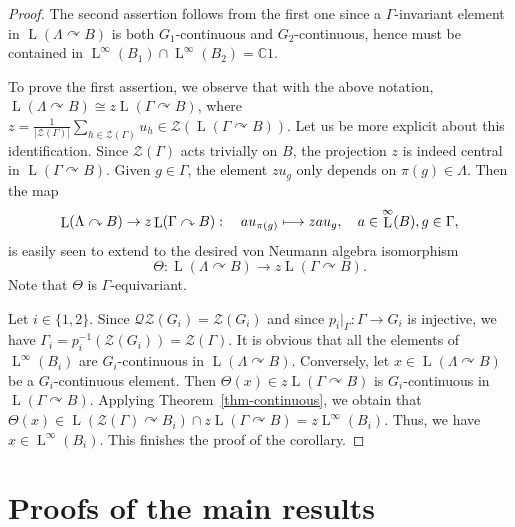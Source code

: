 \documentclass[JEP,XML,SOM,Unicode,published]{cedram}
\newcommand\mto{\mathchoice{\longmapsto}{\mapsto}{\mapsto}{\mapsto}}
\theoremstyle{definition}
\newcommand{\C}{\mathbb{C}}
\DeclareMathOperator{\rL}{L}
\begin{document}
\begin{proof}
The second assertion follows from the first one since a $\Gamma$-invariant element in $\rL(\Lambda \curvearrowright B)$ is both $G_1$-continuous and $G_2$-continuous, hence must be contained in $\rL^\infty(B_1) \cap \rL^\infty(B_2) = \C 1$.

To prove the first assertion, we observe that with the above notation, $\rL(\Lambda \curvearrowright B) \cong z \rL(\Gamma \curvearrowright B)$, where $z = \frac{1}{|\mathscr Z(\Gamma)|} \sum_{h \in \mathscr Z(\Gamma)} u_h \in \mathscr Z(\rL(\Gamma \curvearrowright B))$. Let us be more explicit about this identification. Since $\mathscr Z(\Gamma)$ acts trivially on $B$, the projection $z$ is indeed central in $\rL(\Gamma \curvearrowright B)$. Given $g \in \Gamma$, the element $zu_g$ only depends on $\pi(g) \in \Lambda$. Then the map
\[
\rL(\Lambda \curvearrowright B) \to z\rL(\Gamma \curvearrowright B) : \quad a u_{\pi(g)} \mto zau_g, \quad a \in \rL^\infty(B), g \in \Gamma,
\]
is easily seen to extend to the desired von Neumann algebra isomorphism \[
\Theta : \rL(\Lambda \curvearrowright B) \to z\rL(\Gamma \curvearrowright B).
\]
Note that $\Theta$ is $\Gamma$-equivariant.

Let $i \in \{1,2\}$. Since $\mathscr{Q}\mathscr{Z}(G_i) = \mathscr Z(G_i)$ and since $p_i|_\Gamma : \Gamma \to G_i$ is injective, we have $\Gamma_i = p_i^{-1}( \mathscr Z(G_i)) = \mathscr Z(\Gamma)$. It is obvious that all the elements of $\rL^\infty(B_i)$ are $G_i$\nobreakdash-con\-tinuous in $\rL(\Lambda \curvearrowright B)$. Conversely, let $x \in \rL(\Lambda \curvearrowright B)$ be a $G_i$-continuous element. Then $\Theta(x) \in z\rL(\Gamma \curvearrowright B)$ is $G_i$-continuous in $\rL(\Gamma \curvearrowright B)$. Applying Theorem~\ref{thm-continuous}, we obtain that $\Theta(x) \in \rL(\mathscr Z(\Gamma) \curvearrowright B_i) \cap z\rL(\Gamma \curvearrowright B) = z \rL^\infty(B_i)$. Thus, we have $x \in \rL^\infty(B_i)$. This finishes the proof of the corollary.
\end{proof}

\section{Proofs of the main results}
\end{document}
